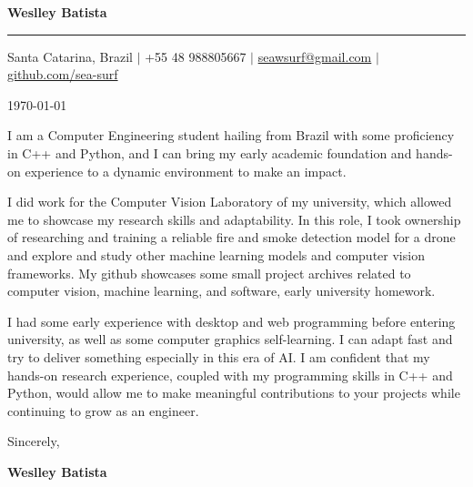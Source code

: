 \documentclass[a4paper,10pt]{article}
\begin{document}
\pagestyle{empty} %

\begin{center}
    {\huge \textbf{Weslley Batista}} \\ %
    \vspace{4pt}
    \hrule
    \vspace{6pt}
    {\small
    Santa Catarina, Brazil \quad $|$ \quad
    +55 48 988805667 \quad $|$ \quad
    \href{mailto:seawsurf@gmail.com}{seawsurf@gmail.com} \quad $|$ \quad 
    \href{https://github.com/sea-surf}{github.com/sea-surf}
    }
\end{center}

\vspace{20pt}

\noindent \today

\vspace{15pt}

\noindent I am a Computer Engineering student hailing from Brazil with some proficiency in C++ and Python, and I can bring my early academic foundation and hands-on experience to a dynamic environment to make an impact.

\vspace{10pt}

\noindent I did work for the Computer Vision Laboratory of my university, which allowed me to showcase my research skills and adaptability. In this role, I took ownership of researching and training a reliable fire and smoke detection model for a drone and explore and study other machine learning models and computer vision frameworks. My github showcases some small project archives related to computer vision, machine learning, and software, early university homework.

\vspace{10pt}

\noindent I had some early experience with desktop and web programming before entering university, as well as some computer graphics self-learning. I can adapt fast and try to deliver something especially in this era of AI. I am confident that my hands-on research experience, coupled with my programming skills in C++ and Python, would allow me to make meaningful contributions to your projects while continuing to grow as an engineer. 

\vspace{20pt}

\noindent Sincerely,

\vspace{10pt}

\noindent \textbf{Weslley Batista}
\end{document}
